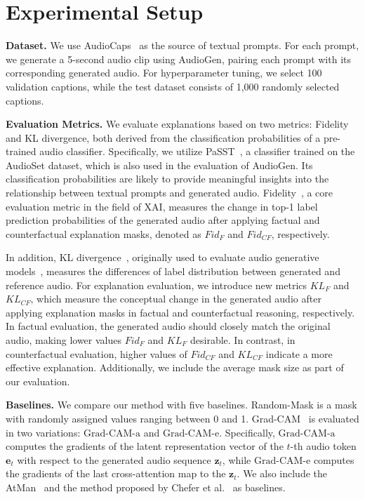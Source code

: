 \section{Experimental Setup}
\label{exp-setup}

\textbf{Dataset.} We use AudioCaps~\cite{kim2019audiocaps} as the source of textual prompts. For each prompt, we generate a 5-second audio clip using AudioGen, pairing each prompt with its corresponding generated audio. For hyperparameter tuning, we select 100 validation captions, while the test dataset consists of 1,000 randomly selected captions.

\textbf{Evaluation Metrics.} We evaluate explanations based on two metrics: Fidelity and KL divergence, both derived from the classification probabilities of a pre-trained audio classifier. Specifically, we utilize PaSST~\cite{cai2022efficient}, a classifier trained on the AudioSet dataset, which is also used in the evaluation of AudioGen. Its classification probabilities are likely to provide meaningful insights into the relationship between textual prompts and generated audio. Fidelity~\cite{yuan2021explainability, ali2023explainable}, a core evaluation metric in the field of XAI, measures the change in top-1 label prediction probabilities of the generated audio after applying factual and counterfactual explanation masks, denoted as $Fid_{F}$ and $Fid_{CF}$, respectively. 

In addition, KL divergence~\cite{kilgour2018fr}, originally used to evaluate audio generative models~\cite{kreuk2022audiogen, yang2023diffsound, huang2023make}, measures the differences of label distribution between generated and reference audio. For explanation evaluation, we introduce new metrics $KL_{F}$ and $KL_{CF}$, which measure the conceptual change in the generated audio after applying explanation masks in factual and counterfactual reasoning, respectively. In factual evaluation, the generated audio should closely match the original audio, making lower values $Fid_{F}$ and $KL_{F}$ desirable. In contrast, in counterfactual evaluation, higher values of $Fid_{CF}$ and $KL_{CF}$ indicate a more effective explanation. Additionally, we include the average mask size as part of our evaluation.

\textbf{Baselines.} We compare our method with five baselines. Random-Mask is a mask with randomly assigned values ranging between 0 and 1. Grad-CAM~\cite{selvaraju2017grad} is evaluated in two variations: $\text{Grad-CAM-a}$ and $\text{Grad-CAM-e}$. Specifically, $\text{Grad-CAM-a}$ computes the gradients of the latent representation vector of the $t$-th audio token $\textbf{e}_t$ with respect to the generated audio sequence $\textbf{z}_t$, while $\text{Grad-CAM-e}$ computes the gradients of the last cross-attention map to the $\textbf{z}_t$. We also include the AtMan~\cite{deiseroth2023atman} and the method proposed by Chefer et al.~\cite{chefer2021generic} as baselines.

